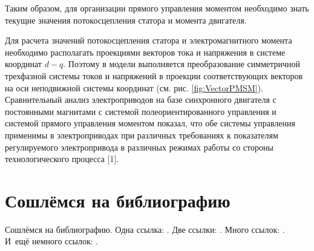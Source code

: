 Таким образом, для организации прямого управления моментом необходимо знать текущие значения потокосцепления статора и момента двигателя.

Для расчета значений потокосцепления статора и электромагнитного момента необходимо располагать проекциями векторов тока и напряжения в системе координат $d-q$. Поэтому в модели выполняется преобразование симметричной трехфазной системы токов и напряжений в проекции соответствующих векторов на оси неподвижной системы координат (см. рис. \ref{fig:VectorPMSM}). 
Сравнительный анализ электроприводов на базе синхронного двигателя с постоянными магнитами с системой полеориентированного управления и системой прямого управления
моментом показал, что обе системы управления применимы в электроприводах при различных требованиях к показателям регулируемого электропривода в различных режимах работы со стороны технологического процесса [1].

\section{Сошлёмся на библиографию} \label{sec:ch1/sec4}


Сошлёмся на библиографию.
Одна ссылка: \cite[с.~54]{Sokolov}\cite[с.~36]{Gaidaenko}.
Две ссылки: \cite{Sokolov,Gaidaenko}.
Много ссылок: %
\cite{Lermontov, Management, Borozda, Marketing, Constitution, FamilyCode,
	Gost.7.0.53, Razumovski, Lagkueva, Pokrovski, Methodology, Nasirova, Berestova,
	Kriger}%
%
.
И~ещё немного ссылок:
\cite{Article,Book,Booklet,Conference,Inbook,Incollection,Manual,Mastersthesis,
	Misc,Phdthesis,Proceedings,Techreport,Unpublished}
\cite{medvedev2006jelektronnye, CEAT:CEAT581, doi:10.1080/01932691.2010.513279,
	Gosele1999161,Li2007StressAnalysis, Shoji199895, test:eisner-sample,
	test:eisner-sample-shorted, AB_patent_Pomerantz_1968, iofis_patent1960}
%
.

